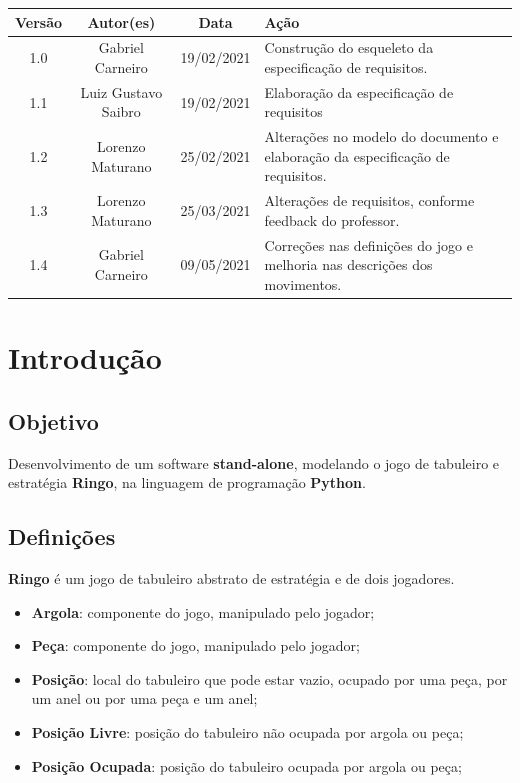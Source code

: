\documentclass[12pt]{article}
\begin{document}
\begin{center}
\begin{tabular}{|c|c|c|m{4.5cm}|}
    \hline
    Versão & Autor(es) & Data & Ação \\
    \hline
    1.0 & Gabriel Carneiro & 19/02/2021 & Construção do esqueleto da especificação de requisitos. \\
    \hline
    1.1 & Luiz Gustavo Saibro & 19/02/2021 &  Elaboração da especificação de requisitos\\
    \hline
    1.2 & Lorenzo Maturano & 25/02/2021 & Alterações no modelo do documento e elaboração da especificação de requisitos. \\
    \hline
    1.3 & Lorenzo Maturano & 25/03/2021 & Alterações de requisitos, conforme feedback do professor. \\
    \hline
    1.4 & Gabriel Carneiro & 09/05/2021 & Correções nas definições do jogo e melhoria nas descrições dos movimentos. \\
    \hline
\end{tabular}
\end{center}

\newpage

\tableofcontents

\newpage

\section{Introdução}

\subsection{Objetivo}
Desenvolvimento de um software \textbf{stand-alone}, modelando o jogo de tabuleiro e estratégia \textbf{Ringo}, na linguagem de programação \textbf{Python}.

\subsection{Definições}
\textbf{Ringo} é um jogo de tabuleiro abstrato de estratégia e de dois jogadores.

\begin{itemize}
    \item \textbf{Argola}: componente do jogo, manipulado pelo jogador;
    \item \textbf{Peça}: componente do jogo, manipulado pelo jogador;
    \item \textbf{Posição}: local do tabuleiro que pode estar vazio, ocupado por uma peça, por um anel ou por uma peça e um anel;
    \item \textbf{Posição Livre}: posição do tabuleiro não ocupada por argola ou peça;
    \item \textbf{Posição Ocupada}: posição do tabuleiro ocupada por argola ou peça;
\end{itemize}
\end{document}
